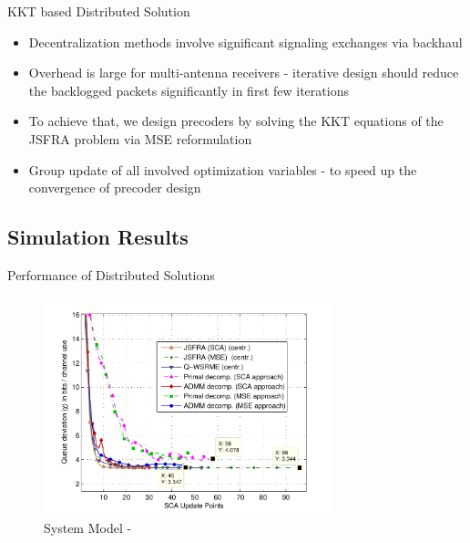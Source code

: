 \documentclass[9pt]{beamer}
\begin{document}
\begin{frame}{KKT based Distributed Solution}
	\begin{itemize}
		\item Decentralization methods involve significant signaling exchanges via backhaul
		\item \alert{Overhead is large for multi-antenna receivers} - iterative design should reduce the backlogged packets significantly in first few iterations
		\item To achieve that, we design precoders by solving the \ac{KKT} equations of the \acs{JSFRA} problem via \acs{MSE} reformulation
		\item \alert{Group update of all involved optimization variables} - to speed up the convergence of precoder design
	\end{itemize}
\end{frame}


\subsection{Simulation Results}

\begin{frame}{Performance of Distributed Solutions}
	\begin{figure}
		\centering
		\includegraphics[width=0.75\textwidth]{fig-3-2}
		\caption{System Model - }
	\end{figure}
\end{frame}
\end{document}
